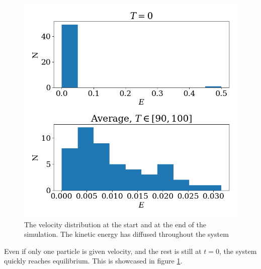 \documentclass{article}
\begin{document}
        \begin{figure}

            \includegraphics[width = \textwidth]{all_vel_to_one}
            \caption{The velocity distribution at the start and at the end of the simulation. The kinetic energy has diffused throughout the system}
            \label{kinetic energy}

        \end{figure}

        Even if only one particle is given velocity, and the rest is still at $t = 0$, the system quickly reaches equilibrium. This is showcased in figure \ref{kinetic energy}. 
\end{document}
